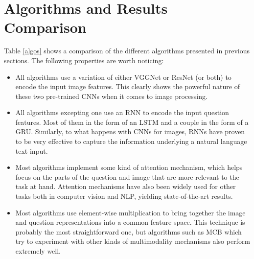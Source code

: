 \documentclass{article}
\begin{document}
\section{Algorithms and Results Comparison}\label{resSec}
Table \ref{algos} shows a comparison of the different algorithms presented in previous sections. The following properties are worth noticing:
\begin{itemize}
    \item All algorithms use a variation of either VGGNet or ResNet (or both) to encode the input image features. This clearly shows the powerful nature of these two pre-trained CNNs when it comes to image processing.
    \item All algorithms excepting one use an RNN to encode the input question features. Most of them in the form of an LSTM and a couple in the form of a GRU. Similarly, to what happens with CNNs for images, RNNs have proven to be very effective to capture the information underlying a natural language text input. 
    \item Most algorithms implement some kind of attention mechanism, which helps focus on the parts of the question and image that are more relevant to the task at hand. Attention mechanisms have also been widely used for other tasks both in computer vision and NLP, yielding state-of-the-art results.
    \item Most algorithms use element-wise multiplication to bring together the image and question representations into a common feature space. This technique is probably the most straightforward one, but algorithms such as MCB which try to experiment with other kinds of multimodality mechanisms also perform extremely well.
\end{itemize}
\end{document}
